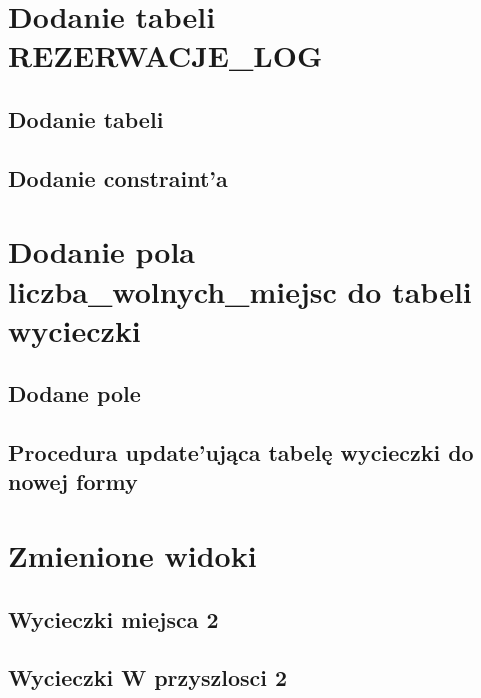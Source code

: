 \documentclass[12pt]{article}
\begin{document}
	\pagebreak
	
	\section{Dodanie tabeli REZERWACJE\_LOG}
	
	\subsection{Dodanie tabeli}
	
	
	\subsection{Dodanie constraint'a}
	
	
	\section{Dodanie pola liczba\_wolnych\_miejsc do tabeli wycieczki}
	
	\subsection{Dodane pole}
	
	
	\subsection{Procedura update'ująca tabelę wycieczki do nowej formy}
	
	
	\pagebreak
	
	\section{Zmienione widoki}
	
	\subsection{Wycieczki miejsca 2}
	
	
	\subsection{Wycieczki W przyszlosci 2}
	
	
\end{document}
